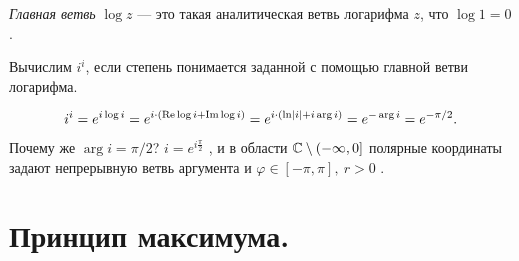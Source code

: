 \documentclass[../complex-analysis.tex]{subfiles}
\begin{document}
\begin{df}
 \textit{Главная ветвь} $ \log z $ --- это такая аналитическая ветвь логарифма $ z $, что $ \log 1 = 0 $.
\end{df}
\begin{exmpl}
 Вычислим $ i^{i} $, если степень понимается заданной с помощью главной ветви логарифма.

\begin{align*}
 i^{i} = e^{i \log i} = e^{i \cdot \left( \operatorname{Re} \log i + \operatorname{Im} \log i \right)} = e^{i \cdot \left( \ln \left| i \right| + i \arg i \right)} = e^{-\arg i} = e^{-\pi / 2}.
\end{align*} Почему же $ \arg i = \pi / 2 $?  $ i = e^{i \frac{\pi}{2}} $ , и в области $ \mathbb{C} \setminus \left(-\infty, 0\right]   $  полярные координаты задают непрерывную ветвь аргумента и $\varphi \in [-\pi, \pi], \ r > 0$ . 
\end{exmpl}

\newpage
\section{Принцип максимума.}
\end{document}
